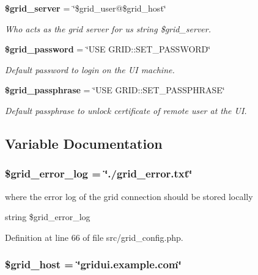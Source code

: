 \begin{CompactItemize}
{\bf \$grid\_\-server} = \char`\"{}\$grid\_\-user@\$grid\_\-host\char`\"{}
\begin{CompactList}\small\item\em Who acts as the grid server for us  string \$grid\_\-server. \item\end{CompactList}\item 
{\bf \$grid\_\-password} = \char`\"{}USE GRID::SET\_\-PASSWORD\char`\"{}
\begin{CompactList}\small\item\em Default password to login on the UI machine. \item\end{CompactList}\item 
{\bf \$grid\_\-passphrase} = \char`\"{}USE GRID::SET\_\-PASSPHRASE\char`\"{}
\begin{CompactList}\small\item\em Default passphrase to unlock certificate of remote user at the UI. \item\end{CompactList}\end{CompactItemize}


\subsection{Variable Documentation}
\subsubsection{\setlength{\rightskip}{0pt plus 5cm}\$grid\_\-error\_\-log = \char`\"{}./grid\_\-error.txt\char`\"{}}\label{src_2grid__config_8php_a2}


where the error log of the grid connection should be stored locally 

string \$grid\_\-error\_\-log 

Definition at line 66 of file src/grid\_\-config.php.
\subsubsection{\setlength{\rightskip}{0pt plus 5cm}\$grid\_\-host = \char`\"{}gridui.example.com\char`\"{}}\label{src_2grid__config_8php_a4}


